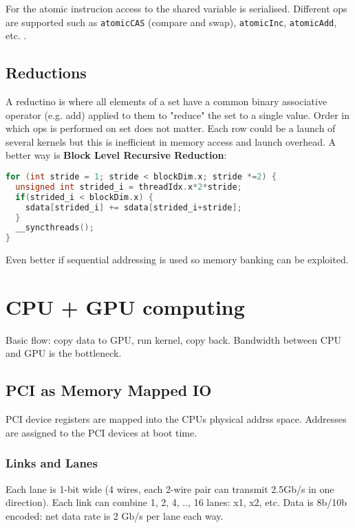 \documentclass[a4paper, fontsize=8pt, landscape, DIV=1]{scrartcl}
\begin{document}
\begin{multicols*}{4}
  For the atomic instrucion access to the shared variable is serialised. Different ops are supported
  such as \texttt{atomicCAS} (compare and swap), \texttt{atomicInc}, \texttt{atomicAdd}, etc. .

  \subsection{Reductions}
  A reductino is where all elements of a set have a common binary associative operator (e.g. add)
  applied to them to "reduce" the set to a single value. Order in which ops is performed on set does
  not matter.
  Each row could be a launch of several kernels but this is inefficient in memory access and launch overhead.
  A better way is \textbf{Block Level Recursive Reduction}:
\begin{lstlisting}[language=C]
for (int stride = 1; stride < blockDim.x; stride *=2) {
  unsigned int strided_i = threadIdx.x*2*stride;
  if(strided_i < blockDim.x) {
    sdata[strided_i] += sdata[strided_i+stride];
  }
  __syncthreads();
}\end{lstlisting}
  
  Even better if sequential addressing is used so memory banking can be exploited.

  \section{CPU + GPU computing}
  Basic flow: copy data to GPU, run kernel, copy back. Bandwidth between CPU and GPU is the bottleneck. 

  \subsection{PCI as Memory Mapped IO}
  PCI device registers are mapped into the CPUs physical addrss space. Addresses are assigned to
  the PCI devices at boot time.

  \subsubsection{Links and Lanes}
  Each lane is 1-bit wide (4 wires, each 2-wire pair can transmit 2.5Gb/s in one direction). Each link
  can combine 1, 2, 4, .., 16 lanes: x1, x2, etc. Data is 8b/10b encoded: net data rate is 2 Gb/s per lane
  each way.


\end{multicols*}
\end{document}
